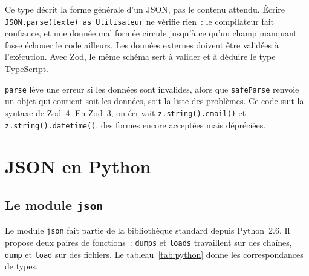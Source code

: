 \documentclass[12pt,a4paper]{article}
\newcommand{\exemple}[3][]{%
  \par\addvspace{6pt}\noindent\begin{minipage}{\linewidth}%
  \end{minipage}\par\addvspace{6pt}}
\begin{document}
\exemple[language=javascript]{js/07_types_json.ts}{Type récursif d'une valeur JSON}

Ce type décrit la forme générale d'un JSON, pas le contenu attendu. Écrire \texttt{JSON.parse(texte) as Utilisateur} ne vérifie rien~: le compilateur fait confiance, et une donnée mal formée circule jusqu'à ce qu'un champ manquant fasse échouer le code ailleurs. Les données externes doivent être validées à l'exécution. Avec Zod, le même schéma sert à valider et à déduire le type TypeScript.

\exemple[language=javascript]{js/08_zod.ts}{Validation à l'exécution avec Zod 4}

\texttt{parse} lève une erreur si les données sont invalides, alors que \texttt{safeParse} renvoie un objet qui contient soit les données, soit la liste des problèmes. Ce code suit la syntaxe de Zod~4. En Zod~3, on écrivait \texttt{z.string().email()} et \texttt{z.string().datetime()}, des formes encore acceptées mais dépréciées.

\section{JSON en Python}
\label{sec:python}

\subsection{Le module \texttt{json}}
Le module \texttt{json} fait partie de la bibliothèque standard depuis Python~2.6. Il propose deux paires de fonctions~: \texttt{dumps} et \texttt{loads} travaillent sur des chaînes, \texttt{dump} et \texttt{load} sur des fichiers. Le tableau~\ref{tab:python} donne les correspondances de types.
\end{document}
